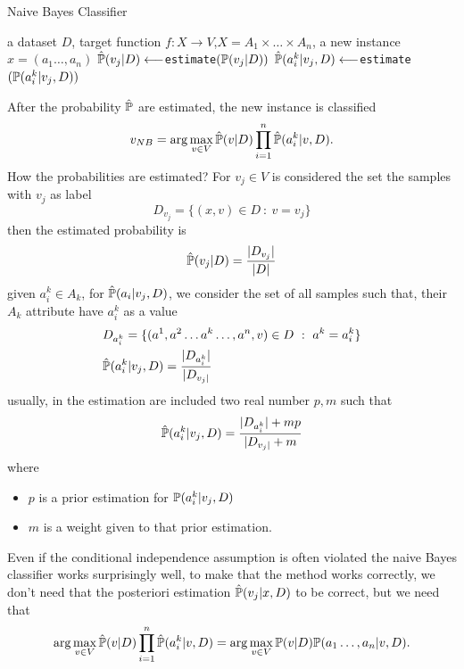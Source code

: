 \documentclass[10pt, letterpaper]{report}
\begin{document}
\begin{algorithm}
	\caption{Naive Bayes Classifier}\label{alg:naive_bayes}
	\begin{algorithmic}
		\Require a dataset $D$, target function $f:X\rightarrow V$,$X=A_1\times \dots \times A_n$, a new instance $x=(a_1\dots,a_n)$
		\State $\hat {{\mathbb P}}(v_j|D)\longleftarrow$\texttt{estimate}$({\mathbb P}(v_j|D))$
		\State $\hat {{\mathbb P}}(a_i^k|v_j,D)\longleftarrow$\texttt{estimate}$({\mathbb P}(a_i^k|v_j,D))$
		\EndFor
		\EndFor
		\EndFor
	\end{algorithmic}
\end{algorithm}

After the probability $\hat{{\mathbb P}}$ are estimated, the new instance is classified\begin{equation}
	v_{NB}=\arg\max_{v\in V}\hat{{\mathbb P}}(v|D)\prod_{i=1}^{n}\hat{{\mathbb P}}(a_i^k|v,D).
\end{equation}
How the probabilities are estimated? For $v_j\in V$ is considered the set the samples with $v_j$ as label\begin{equation}
	D_{v_j}=\{(x,v)\in D \ : \ v=v_j\}
\end{equation}
then the estimated probability is \begin{equation}
	\hat{{\mathbb P}}(v_j|D)=\frac{|D_{v_j}|}{|D|}
\end{equation}
given $a_i^k\in A_k$, for $\hat {{\mathbb P}}(a_i|v_j,D)$, we consider the set of all samples such that, their $A_k$ attribute have $a_i^k$ as a value\begin{align}
	 & D_{a_i^k}=\{(a^1,a^2\dots a^k \dots , a^n,v)\in D \ : \ a^k=a^k_i\} \\
	 & \hat \Prob(a_i^k|v_j,D)=\frac{|D_{a_i^k}|}{|D_{v_j|}}
\end{align}
usually, in the estimation are included two real number $p,m$ such that\begin{equation}
	\hat {{\mathbb P}}(a_i^k|v_j,D)=\frac{|D_{a_i^k}|+mp}{|D_{v_j|}+m}
\end{equation}
where\begin{itemize}
	\item $p$ is a prior estimation for ${\mathbb P}(a_i^k|v_j,D)$
	\item $m$ is a weight given to that prior estimation.
\end{itemize}
Even if the conditional independence assumption is often violated the naive Bayes classifier works surprisingly well, to make that the method works correctly, we don't need that the posteriori estimation $\hat{{\mathbb P}}(v_j|x,D)$ to be correct, but we need that\begin{equation}
	\arg\max_{v\in V}\hat{{\mathbb P}}(v|D)\prod_{i=1}^{n}\hat{{\mathbb P}}(a_i^k|v,D)=\arg\max_{v\in V}{\mathbb P}(v|D){\mathbb P}(a_1\dots, a_n|v,D).
\end{equation}
\end{document}
